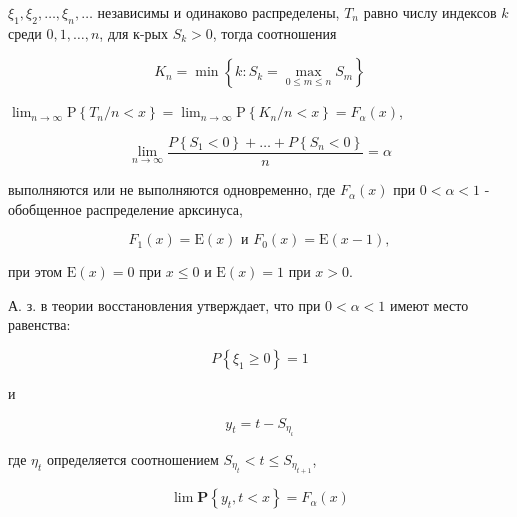 \documentclass[10pt]{article}
\begin{document}
$\xi_{1}, \xi_{2}, \ldots, \xi_{n}, \ldots$ независимы и одинаково распределены, $T_{n}$ равно числу индексов $k$ среди $0,1, \ldots, n$, для к-рых $S_{k}>0$, тогда соотношения



\[

K_{n}=\min \left\{k: S_{k}=\max _{0 \leqslant m \leqslant n} S_{m}\right\}

\]



$\lim _{n \rightarrow \infty} \mathrm{P}\left\{T_{n} / n<x\right\}=\lim _{n \rightarrow \infty} \mathrm{P}\left\{K_{n} / n<x\right\}=F_{\alpha}(x)$,



\[

\lim _{n \rightarrow \infty} \frac{P\left\{S_{1}<0\right\}+\ldots+P\left\{S_{n}<0\right\}}{n}=\alpha

\]



выполняются или не выполняются одновременно, где $F_{\alpha}(x)$ при $0<\alpha<1$ - обобщенное распределение арксинуса,



\[

F_{1}(x)=\mathrm{E}(x) \text { и } F_{0}(x)=\mathrm{E}(x-1),

\]



при этом $\mathrm{E}(x)=0$ при $x \leqslant 0$ и $\mathrm{E}(x)=1$ при $x>0$.



А. з. в теории восстановления утверждает, что при $0<\alpha<1$ имеют место равенства:



\[

P\left\{\xi_{1} \geqslant 0\right\}=1

\]



и



\[

y_{t}=t-S_{\eta_{\iota}}

\]



где $\eta_{t}$ определяется соотношением $S_{\eta_{t}}<t \leqslant S_{\eta_{t+1}}$,



\[

\lim \mathbf{P}\left\{y_{t}, t<x\right\}=F_{\alpha}(x)

\]
\end{document}
